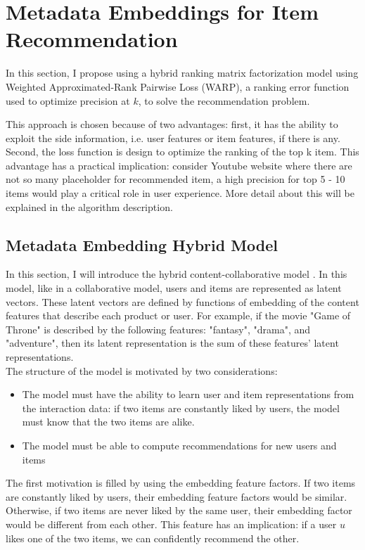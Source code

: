 \section{Metadata Embeddings for Item Recommendation}
In this section, I propose using a hybrid ranking matrix factorization model using Weighted Approximated-Rank Pairwise Loss (WARP), a ranking error function used to optimize precision at \(k\), to solve the recommendation problem. 

This approach is chosen because of two advantages: first, it has the ability to exploit the side information, i.e. user features or item features, if there is any. Second, the loss function is design to optimize the ranking of the top k item. This advantage has a practical implication: consider Youtube website where there are not so many placeholder for recommended item, a high precision for top 5 - 10 items would play a critical role in user experience. More detail about this will be explained in the algorithm description.

\subsection{Metadata Embedding Hybrid Model}

In this section, I will introduce the hybrid content-collaborative model \cite{kula2015metadata}. In this model, like in a collaborative model, users and items are represented as latent vectors. These latent vectors are defined by functions of embedding of the content features that describe each product or user. For example, if the movie "Game of Throne" is described by the following features: "fantasy", "drama", and "adventure", then its latent representation is the sum of these features' latent representations.\\

\noindent The structure of the model is motivated by two considerations:

\begin{itemize}
	\item The model must have the ability to learn user and item representations from the interaction data: if two items are constantly liked by users, the model must know that the two items are alike.
	\item The model must be able to compute recommendations for new users and items
\end{itemize}

\noindent The first motivation is filled by using the embedding feature factors. If two items are constantly liked by users, their embedding feature factors would be similar. Otherwise, if two items are never liked by the same user, their embedding factor would be different from each other. This feature has an implication: if a user \(u\) likes one of the two items, we can confidently recommend the other.

